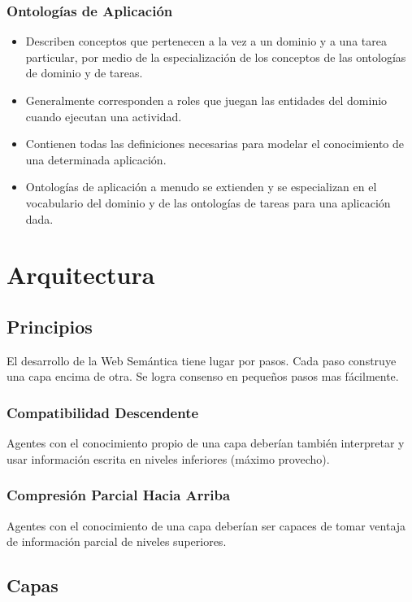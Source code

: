 \documentclass[a4paper,12pt,twoside,final,spanish]{article}
\begin{document}
\subsubsection{Ontologías de Aplicación}

\begin{itemize}
\item Describen conceptos que pertenecen a la vez a un dominio y a una tarea particular, por medio de la especialización de los conceptos de las ontologías de dominio y de tareas.
\item Generalmente corresponden a roles que juegan las entidades del dominio cuando ejecutan una actividad.
\item Contienen todas las definiciones necesarias para modelar el conocimiento de una determinada aplicación.
\item Ontologías de aplicación a menudo se extienden y se especializan en el vocabulario del dominio y de las ontologías de tareas para una aplicación dada.
\end{itemize}

\section{Arquitectura}

\subsection{Principios}

El desarrollo de la Web Semántica tiene lugar por pasos. Cada paso construye una capa encima de otra. Se logra consenso en pequeños pasos mas fácilmente.

\subsubsection{Compatibilidad Descendente}

Agentes con el conocimiento propio de una capa deberían también interpretar y usar información escrita en niveles inferiores (máximo provecho).

\subsubsection{Compresión Parcial Hacia Arriba}

Agentes con el conocimiento de una capa deberían ser capaces de tomar ventaja de información parcial de niveles superiores.

\subsection{Capas}
\end{document}

